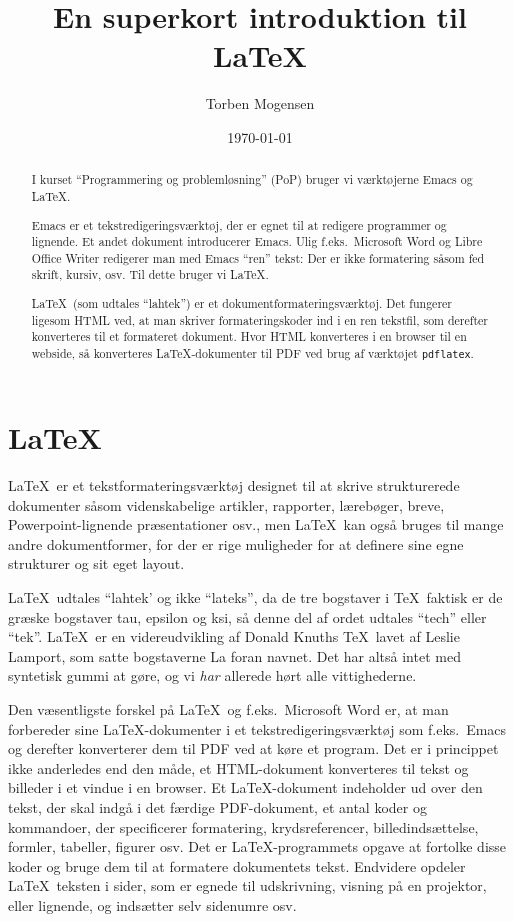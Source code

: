 \documentclass[a4paper]{report}
\begin{document}
\title{En superkort introduktion til \LaTeX}

\author{Torben Mogensen}
\date{\today}

\maketitle

\begin{abstract}
I kurset ``Programmering og problemløsning'' (PoP) bruger vi
værktøjerne Emacs og \LaTeX.

Emacs er et tekstredigeringsværktøj, der er egnet til at redigere
programmer og lignende.  Et andet dokument introducerer Emacs. Ulig f.eks.\ Microsoft Word og Libre Office
Writer redigerer man med Emacs ``ren'' tekst: Der er ikke formatering
såsom fed skrift, kursiv, osv.  Til dette bruger vi \LaTeX.

\LaTeX\ (som udtales ``lahtek'') er et dokumentformateringsværktøj.
Det fungerer ligesom HTML ved, at man skriver formateringskoder ind i
en ren tekstfil, som derefter konverteres til et formateret dokument.
Hvor HTML konverteres i en browser til en webside, så konverteres
\LaTeX-dokumenter til PDF ved brug af værktøjet \texttt{pdflatex}.
\end{abstract}

\tableofcontents


\chapter{\LaTeX}

\LaTeX\ er et tekstformateringsværktøj designet til at skrive
strukturerede dokumenter såsom videnskabelige artikler, rapporter,
lærebøger, breve, Powerpoint-lignende præsentationer osv., men
\LaTeX\ kan også bruges til mange andre dokumentformer, for der er
rige muligheder for at definere sine egne strukturer og sit eget
layout.

\LaTeX\ udtales ``lahtek' og ikke ``lateks'', da de tre bogstaver i
\TeX\ faktisk er de græske bogstaver tau, epsilon og ksi, så denne del
af ordet udtales ``tech'' eller ``tek''. \LaTeX\ er en videreudvikling
af Donald Knuths \TeX\ lavet af Leslie Lamport, som satte bogstaverne
\textsf{La} foran navnet.  Det har altså intet med syntetisk gummi at
gøre, og vi \emph{har} allerede hørt alle vittighederne.

Den væsentligste forskel på \LaTeX\ og f.eks.~Microsoft Word er, at man
forbereder sine \LaTeX-dokumenter i et tekstredigeringsværktøj som
f.eks.~Emacs og derefter konverterer dem til PDF ved at køre et
program.  Det er i princippet ikke anderledes end den måde, et
HTML-dokument konverteres til tekst og billeder i et vindue i en
browser.  Et \LaTeX-dokument indeholder ud over den tekst, der skal
indgå i det færdige PDF-dokument, et antal koder og kommandoer, der
specificerer formatering, krydsreferencer, billedindsættelse,
formler, tabeller, figurer osv.  Det er \LaTeX-programmets opgave at
fortolke disse koder og bruge dem til at formatere dokumentets tekst.
Endvidere opdeler \LaTeX\ teksten i sider, som er egnede til
udskrivning, visning på en projektor, eller lignende, og indsætter
selv sidenumre osv.
\end{document}
